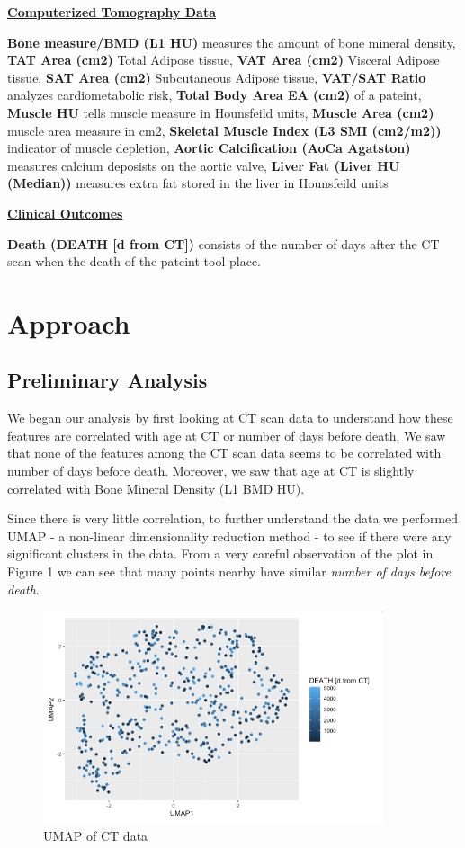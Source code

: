 \documentclass{article}
\begin{document}
\underline{\textbf{Computerized Tomography Data}}

\textbf{Bone measure/BMD (L1 HU)} measures the amount of bone mineral density, \textbf{TAT Area (cm2)} Total Adipose tissue, \textbf{VAT Area (cm2)} Visceral Adipose tissue, \textbf{SAT Area (cm2)} Subcutaneous Adipose tissue, \textbf{VAT/SAT Ratio} analyzes cardiometabolic risk, \textbf{Total Body Area EA (cm2)} of a pateint, \textbf{Muscle HU} tells muscle measure in Hounsfeild units, \textbf{Muscle Area (cm2)} muscle area measure in cm2, \textbf{Skeletal Muscle Index (L3 SMI (cm2/m2))} indicator of muscle depletion, \textbf{Aortic Calcification (AoCa Agatston)} measures calcium deposists on the aortic valve, \textbf{Liver Fat (Liver HU (Median))} measures extra fat stored in the liver in Hounsfeild units            
 
\underline{\textbf{Clinical Outcomes}}

 \textbf{Death (DEATH [d from CT])} consists of the number of days after the CT scan when the death of the pateint tool place.

\section{Approach}

\subsection{Preliminary Analysis}

We began our analysis by first looking at CT scan data to understand how these features are correlated with age at CT or number of days before death. We saw that none of the features among the CT scan data seems to be correlated with number of days before death. Moreover, we saw that age at CT is slightly correlated with Bone Mineral Density (L1 BMD HU). 

Since there is very little correlation, to further understand the data we performed UMAP - a non-linear dimensionality reduction method - to see if there were any significant clusters in the data. From a very careful observation of the plot in  Figure 1  we can see that many points nearby have similar \emph{number of days before death}. 

\begin{figure}
\centering
\includegraphics[width=10cm]{fig1-2}
\caption{UMAP of CT data}
\end{figure}
\end{document}
